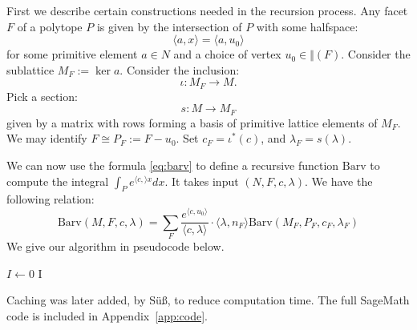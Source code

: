 First we describe certain constructions needed in the recursion process. Any facet \(F\) of a polytope \(P\) is given by the intersection of \(P\) with some halfspace:
\[
\langle a, x \rangle = \langle a, u_0 \rangle
\]
for some primitive element \(a \in N\) and a choice of vertex \(u_0 \in \Vert(F)\). Consider the sublattice \(M_F := \ker a\). Consider the inclusion:
\[
\iota:M_F \to M.
\]
Pick a section:
\[
s: M \to M_F
\]
given by a matrix with rows forming a basis of primitive lattice elements of \(M_F\). We may identify \(F \cong P_F := F - u_0\). Set \(c_F = \iota^*(c)\), and \(\lambda_F = s(\lambda)\).

We can now use the formula \ref{eq:barv} to define a recursive function \(\text{Barv}\) to compute the integral \(\int_P e^{ \langle c , \rangle x} dx\). It takes input \((N,F,c,\lambda)\). We have the following relation:
\[
\text{Barv}(M,F,c,\lambda) = \sum_F \frac{e^{\langle c, u_0 \rangle} }{\langle c, \lambda \rangle} \cdot \langle \lambda, n_F \rangle \text{Barv}(M_F, P_F,c_F,\lambda_F)
\]
We give our algorithm in pseudocode below.
\IncMargin{1em}
\begin{algorithm}[h] \label{alg1}
\BlankLine
\(I \leftarrow 0\)\;
\Return I
\caption{\(\text{Barv}(M,P,c,\lambda)\)}\label{algo_disjdecomp}
\end{algorithm}
Caching was later added, by S\"u\ss, to reduce computation time. The full SageMath code is included in Appendix~\ref{app:code}.
\newpage
